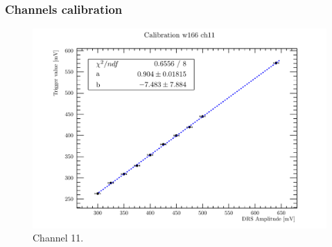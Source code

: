 \documentclass[9pt]{beamer}
\begin{document}

\begin{frame} [fragile]
\small
	\frametitle{Channels calibration}
    		\begin{figure}
		 \centering
			\includegraphics[scale=0.5]{figures/ch11.pdf}
			\caption{Channel 11.}
		\end{figure}  
\end{frame}



\end{document}
